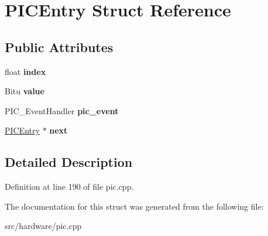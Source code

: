\hypertarget{structPICEntry}{\section{P\-I\-C\-Entry Struct Reference}
\label{structPICEntry}
}
\subsection*{Public Attributes}
\begin{DoxyCompactItemize}
\item 
\hypertarget{structPICEntry_a59d7ce77b2a08f5c9f4ba56b7c1074e5}{float {\bfseries index}}\label{structPICEntry_a59d7ce77b2a08f5c9f4ba56b7c1074e5}

\item 
\hypertarget{structPICEntry_aa24da36d5183c48d36d262f9861b1371}{Bitu {\bfseries value}}\label{structPICEntry_aa24da36d5183c48d36d262f9861b1371}

\item 
\hypertarget{structPICEntry_a1d7e2902f11b356f977faaf6e8f9a5c3}{P\-I\-C\-\_\-\-Event\-Handler {\bfseries pic\-\_\-event}}\label{structPICEntry_a1d7e2902f11b356f977faaf6e8f9a5c3}

\item 
\hypertarget{structPICEntry_a45ff9b7aee4f5401e5d79b0595d818e4}{\hyperlink{structPICEntry}{P\-I\-C\-Entry} $\ast$ {\bfseries next}}\label{structPICEntry_a45ff9b7aee4f5401e5d79b0595d818e4}

\end{DoxyCompactItemize}


\subsection{Detailed Description}


Definition at line 190 of file pic.\-cpp.



The documentation for this struct was generated from the following file\-:\begin{DoxyCompactItemize}
\item 
src/hardware/pic.\-cpp\end{DoxyCompactItemize}
